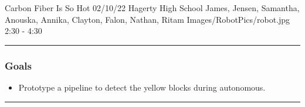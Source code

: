 \insertmeeting 
	{Carbon Fiber Is So Hot} 
	{02/10/22} 
	{Hagerty High School}
	{James, Jensen, Samantha, Anouska, Annika, Clayton, Falon, Nathan, Ritam}
	{Images/RobotPics/robot.jpg}
	{2:30 - 4:30}
	
\noindent\hfil\rule{\textwidth}{.4pt}\hfil
\subsubsection*{Goals}
\begin{itemize}
    \item Prototype a pipeline to detect the yellow blocks during autonomous. 

\end{itemize} 

\noindent\hfil\rule{\textwidth}{.4pt}\hfil

